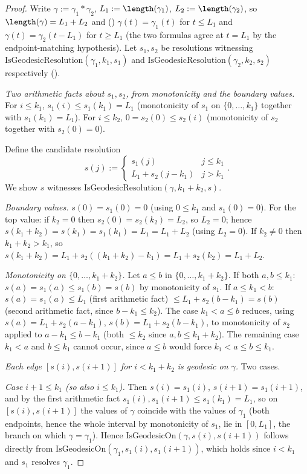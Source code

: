 \begin{proof}
  Write $\gamma := \gamma_1 * \gamma_2$, $L_1 := \length(\gamma_1)$, $L_2 := \length(\gamma_2)$, so
  $\length(\gamma) = L_1+L_2$ and ()
  $\gamma(t) = \gamma_1(t)$ for $t \le L_1$ and $\gamma(t) = \gamma_2(t-L_1)$ for $t \ge L_1$ (the
  two formulas agree at $t=L_1$ by the endpoint-matching hypothesis). Let $s_1,s_2$
  be resolutions witnessing $\mathrm{IsGeodesicResolution}(\gamma_1,k_1,s_1)$ and
  $\mathrm{IsGeodesicResolution}(\gamma_2,k_2,s_2)$ respectively ().

  \emph{Two arithmetic facts about $s_1,s_2$, from monotonicity and the boundary values.} For
  $i \le k_1$, $s_1(i) \le s_1(k_1) = L_1$ (monotonicity of $s_1$ on $\{0,\dots,k_1\}$ together with
  $s_1(k_1)=L_1$). For $i \le k_2$, $0 = s_2(0) \le s_2(i)$ (monotonicity of $s_2$ together with
  $s_2(0)=0$).

  Define the candidate resolution
  \[
    s(j) := \begin{cases} s_1(j) & j \le k_1 \\ L_1 + s_2(j-k_1) & j > k_1 \end{cases}
    .
  \]
  We show $s$ witnesses $\mathrm{IsGeodesicResolution}(\gamma,k_1+k_2,s)$.

  \emph{Boundary values.} $s(0) = s_1(0) = 0$ (using $0 \le k_1$ and $s_1(0)=0$). For the top value:
  if $k_2=0$ then $s_2(0)=s_2(k_2)=L_2$, so $L_2=0$; hence $s(k_1+k_2)=s(k_1)=s_1(k_1)=L_1=L_1+L_2$
  (using $L_2=0$). If $k_2 \ne 0$ then $k_1+k_2 > k_1$, so
  $s(k_1+k_2) = L_1 + s_2((k_1+k_2)-k_1) = L_1+s_2(k_2) = L_1+L_2$.

  \emph{Monotonicity on $\{0,\dots,k_1+k_2\}$.} Let $a \le b$ in $\{0,\dots,k_1+k_2\}$. If both
  $a,b\le k_1$: $s(a)=s_1(a)\le s_1(b)=s(b)$ by monotonicity of $s_1$. If $a\le k_1 < b$:
  $s(a)=s_1(a)\le L_1$ (first arithmetic fact) $\le L_1+s_2(b-k_1)=s(b)$ (second arithmetic fact,
  since $b-k_1\le k_2$). The case $k_1<a\le b$ reduces, using $s(a)=L_1+s_2(a-k_1)$,
  $s(b)=L_1+s_2(b-k_1)$, to monotonicity of $s_2$ applied to $a-k_1\le b-k_1$ (both $\le k_2$ since
  $a,b\le k_1+k_2$). The remaining case $k_1<a$ and $b\le k_1$ cannot occur, since $a\le b$ would
  force $k_1<a\le b\le k_1$.

  \emph{Each edge $[s(i),s(i+1)]$ for $i<k_1+k_2$ is geodesic on $\gamma$.} Two cases.

  \emph{Case $i+1\le k_1$ (so also $i\le k_1$).} Then $s(i)=s_1(i)$, $s(i+1)=s_1(i+1)$, and by the
  first arithmetic fact $s_1(i),s_1(i+1) \le s_1(k_1)=L_1$, so on $[s(i),s(i+1)]$ the values of
  $\gamma$ coincide with the values of $\gamma_1$ (both endpoints, hence the whole interval by
  monotonicity of $s_1$, lie in $[0,L_1]$, the branch on which $\gamma=\gamma_1$). Hence
  $\mathrm{IsGeodesicOn}(\gamma,s(i),s(i+1))$ follows directly from
  $\mathrm{IsGeodesicOn}(\gamma_1,s_1(i),s_1(i+1))$, which holds since $i<k_1$ and $s_1$ resolves
  $\gamma_1$.


\end{proof}
